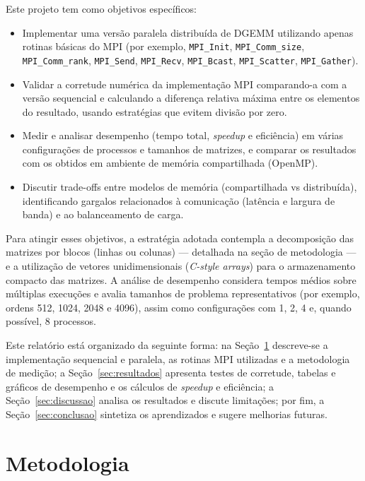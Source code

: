 \documentclass[12pt, a4paper]{article}
\begin{document}
    Este projeto tem como objetivos específicos:
    \begin{itemize}
        \item Implementar uma versão paralela distribuída de DGEMM utilizando apenas rotinas básicas do MPI (por exemplo, \texttt{MPI\_Init}, \texttt{MPI\_Comm\_size}, \texttt{MPI\_Comm\_rank}, \texttt{MPI\_Send}, \texttt{MPI\_Recv}, \texttt{MPI\_Bcast}, \texttt{MPI\_Scatter}, \texttt{MPI\_Gather}).
        \item Validar a corretude numérica da implementação MPI comparando-a com a versão sequencial e calculando a diferença relativa máxima entre os elementos do resultado, usando estratégias que evitem divisão por zero.
        \item Medir e analisar desempenho (tempo total, \emph{speedup} e eficiência) em várias configurações de processos e tamanhos de matrizes, e comparar os resultados com os obtidos em ambiente de memória compartilhada (OpenMP).
        \item Discutir trade-offs entre modelos de memória (compartilhada vs distribuída), identificando gargalos relacionados à comunicação (latência e largura de banda) e ao balanceamento de carga.
    \end{itemize}

    Para atingir esses objetivos, a estratégia adotada contempla a decomposição das matrizes por blocos (linhas ou colunas) --- detalhada na seção de metodologia --- e a utilização de vetores unidimensionais (\textit{C-style arrays}) para o armazenamento compacto das matrizes. A análise de desempenho considera tempos médios sobre múltiplas execuções e avalia tamanhos de problema representativos (por exemplo, ordens 512, 1024, 2048 e 4096), assim como configurações com 1, 2, 4 e, quando possível, 8 processos.

    Este relatório está organizado da seguinte forma: na Seção~\ref{sec:metodologia} descreve-se a implementação sequencial e paralela, as rotinas MPI utilizadas e a metodologia de medição; a Seção~\ref{sec:resultados} apresenta testes de corretude, tabelas e gráficos de desempenho e os cálculos de \emph{speedup} e eficiência; a Seção~\ref{sec:discussao} analisa os resultados e discute limitações; por fim, a Seção~\ref{sec:conclusao} sintetiza os aprendizados e sugere melhorias futuras.

    \newpage
    \section{Metodologia}\label{sec:metodologia}
\end{document}
